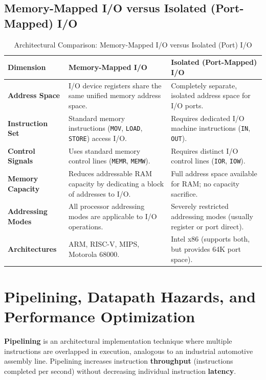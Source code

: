 \subsection{Memory-Mapped I/O versus Isolated (Port-Mapped) I/O}
\begin{table}[htbp]
\centering
\small
\caption{Architectural Comparison: Memory-Mapped I/O versus Isolated (Port) I/O}
\label{tab:memory_vs_isolated_io}
\begin{tabularx}{\textwidth}{l X X}
\toprule
\textbf{Dimension} & \textbf{Memory-Mapped I/O} & \textbf{Isolated (Port-Mapped) I/O} \\
\midrule
\textbf{Address Space} & I/O device registers share the same unified memory address space. & Completely separate, isolated address space for I/O ports. \\
\textbf{Instruction Set} & Standard memory instructions (\texttt{MOV}, \texttt{LOAD}, \texttt{STORE}) access I/O. & Requires dedicated I/O machine instructions (\texttt{IN}, \texttt{OUT}). \\
\textbf{Control Signals} & Uses standard memory control lines (\texttt{MEMR}, \texttt{MEMW}). & Requires distinct I/O control lines (\texttt{IOR}, \texttt{IOW}). \\
\textbf{Memory Capacity} & Reduces addressable RAM capacity by dedicating a block of addresses to I/O. & Full address space available for RAM; no capacity sacrifice. \\
\textbf{Addressing Modes} & All processor addressing modes are applicable to I/O operations. & Severely restricted addressing modes (usually register or port direct). \\
\textbf{Architectures} & ARM, RISC-V, MIPS, Motorola 68000. & Intel x86 (supports both, but provides 64K port space). \\
\bottomrule
\end{tabularx}
\end{table}


\section{Pipelining, Datapath Hazards, and Performance Optimization}
\label{sec:pipelining}

\textbf{Pipelining} is an architectural implementation technique where multiple instructions are overlapped in execution, analogous to an industrial automotive assembly line. Pipelining increases instruction \textbf{throughput} (instructions completed per second) without decreasing individual instruction \textbf{latency}.

